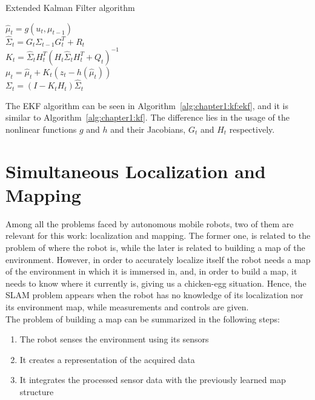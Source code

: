 \begin{algorithm}[h]
    \caption{Extended Kalman Filter algorithm}
    \label{alg:chapter1:kf:ekf}

    \BlankLine
    \BlankLine
    $\hat\mu_t = g \left(u_t, \mu_{t-1}\right)$ \\
    $\hat\Sigma_t = G_t \Sigma_{t-1} G_t^T + R_t$ \\
    \BlankLine
    $K_t = \hat\Sigma_t H_t^T \left(H_t \hat\Sigma_t H_t^T + Q_t\right)^{-1}$ \\
    $\mu_t = \hat\mu_t + K_t \left(z_t - h \left(\hat\mu_t\right) \right) $ \\
    $\Sigma_t = (I - K_t H_t) \hat\Sigma_t$ \\
    \BlankLine
\end{algorithm}

The EKF algorithm can be seen in Algorithm~\ref{alg:chapter1:kf:ekf}, and it is similar to Algorithm~\ref{alg:chapter1:kf}. The difference lies in the usage of the nonlinear functions $g$ and $h$ and their Jacobians, $G_t$ and $H_t$ respectively.

\section{Simultaneous Localization and Mapping}
\label{sec:chapter1:slam}
Among all the problems faced by autonomous mobile robots, two of them are relevant for this work: localization and mapping. The former one, is related to the problem of where the robot is, while the later is related to building a map of the environment. However, in order to accurately localize itself the robot needs a map of the environment in which it is immersed in, and, in order to build a map, it needs to know where it currently is, giving us a chicken-egg situation. Hence, the \ac{SLAM} problem appears when the robot has no knowledge of its localization nor its environment map, while measurements and controls are given.\\

The problem of building a map can be summarized in the following steps:
\begin{enumerate}
    \item{The robot senses the environment using its sensors}
    \item{It creates a representation of the acquired data}
    \item{It integrates the processed sensor data with the previously learned map structure}
\end{enumerate}

